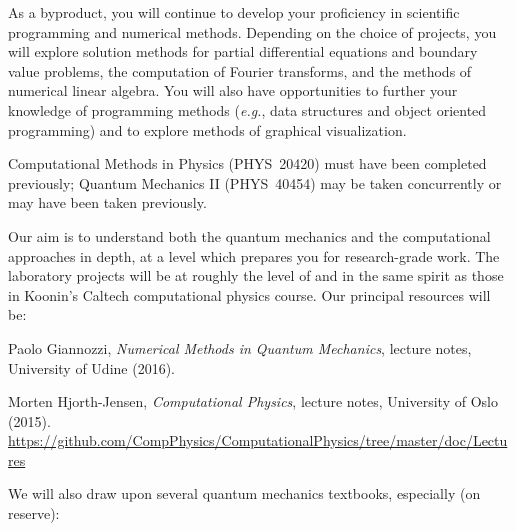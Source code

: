 \documentclass[12pt]{mcplain}
\begin{document}
As a byproduct, you will continue to develop your proficiency in scientific
programming and numerical methods.  Depending on the choice of projects, you
will explore solution methods for partial differential equations and boundary
value problems, the computation of Fourier transforms, and the methods of
numerical linear algebra.  You will also have opportunities to further your
knowledge of programming methods (\textit{e.g.}, data structures and object
oriented programming) and to explore methods of graphical visualization.




\begin{leftindent}
 Computational
 Methods in Physics (PHYS~20420) must have been completed previously;
 Quantum Mechanics II (PHYS~40454) may be taken concurrently or may have been taken previously.
\end{leftindent}





Our aim is to understand both the quantum mechanics and the computational
approaches in depth, at a level which prepares you for research-grade work.  The
laboratory projects will be at roughly the level of and in the same spirit as
those in Koonin's Caltech computational physics course.  Our principal resources
will be:

\begin{leftindentlist*}{\baselineskip}
  \item Paolo Giannozzi, \textit{Numerical Methods in Quantum Mechanics},
  lecture notes, University of Udine (2016).

  \item Morten Hjorth-Jensen, \textit{Computational Physics}, lecture notes,
  University of Oslo (2015).
 \url{https://github.com/CompPhysics/ComputationalPhysics/tree/master/doc/Lectures}
\end{leftindentlist*}

We will also draw upon several quantum mechanics textbooks, especially (on reserve):
\end{document}
